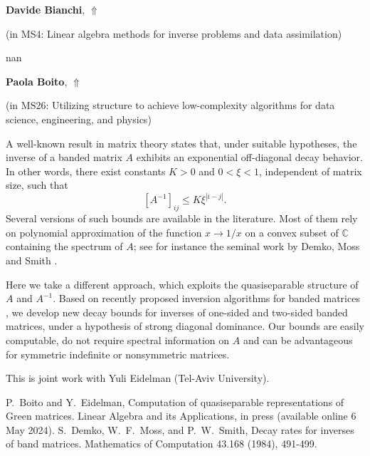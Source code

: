 \documentclass[ILAS2025-program.tex]{subfiles}
\begin{document}
\hypertarget{down0201}{}\begin{ilasabstract}
    
\textbf{Davide Bianchi},  \hfill \hyperlink{up0201}{$\Uparrow$}
    
    
(in {\color{mstitle}MS4: Linear algebra methods for inverse problems and data assimilation})
        
\mtskip
    nan
\end{ilasabstract}
    

\hypertarget{down0025}{}\begin{ilasabstract}
    
\textbf{Paola Boito},  \hfill \hyperlink{up0025}{$\Uparrow$}
    
    
(in {\color{mstitle}MS26: Utilizing structure to achieve low-complexity algorithms for data science, engineering, and physics})
        
\mtskip
    \begin{bibunit}
        A well-known result in matrix theory states that, under suitable hypotheses, the inverse of a banded matrix $A$ exhibits an exponential off-diagonal decay behavior. In other words, there exist constants $K>0$ and $0<\xi<1$, independent of matrix size, such that 
$$
[A^{-1}]_{ij}\leq K \xi^{|i-j|}.
$$
Several versions of such bounds are available in the literature. Most of them rely on polynomial approximation of the function $x\rightarrow 1/x$ on a convex subset of $\mathbb{C}$ containing the spectrum of $A$; see for instance the seminal work by Demko, Moss and Smith \cite{DMS84}.

Here we take a different approach, which exploits the quasiseparable structure of $A$ and $A^{-1}$. Based on recently proposed inversion algorithms for banded matrices \cite{BE23}, we develop new decay bounds for inverses of one-sided and two-sided banded matrices, under a hypothesis of strong diagonal dominance. Our bounds are easily computable, do not require spectral information on $A$ and can be advantageous for symmetric indefinite or nonsymmetric matrices.

This is joint work with Yuli Eidelman (Tel-Aviv University). 


\begin{thebibliography}{99}
P.~Boito and Y.~Eidelman, Computation of quasiseparable representations of Green matrices. Linear Algebra and its Applications, in press (available online 6 May 2024).
S.~Demko, W.~F.~Moss, and P.~W.~Smith,
Decay rates for inverses of band matrices. Mathematics of Computation 43.168 (1984), 491-499.
\end{thebibliography}


        \end{bibunit}
        
\end{ilasabstract}
    
\end{document}
